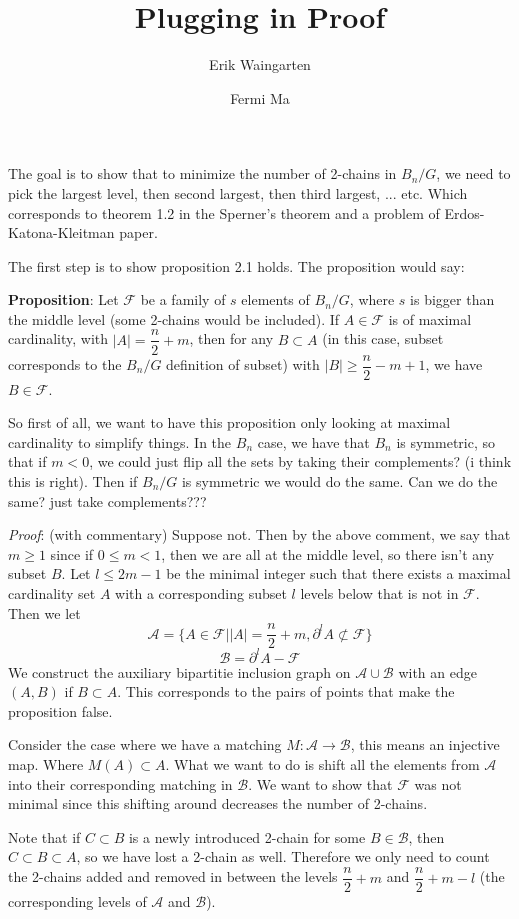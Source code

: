 \documentclass[11pt]{article}
\author{Erik Waingarten \and Fermi Ma}
\title{Plugging in Proof}
\newcommand{\F}{\mathcal{F}}
\newcommand{\A}{\mathcal{A}}
\newcommand{\B}{\mathcal{B}}
\begin{document}
         
\maketitle

The goal is to show that to minimize the number of 2-chains in $B_n/G$, we need to pick the largest level, then second largest, then third largest, ... etc. Which corresponds to theorem 1.2 in the Sperner's theorem and a problem of Erdos-Katona-Kleitman paper.

The first step is to show proposition 2.1 holds. The proposition would say:

\textbf{Proposition}: Let $\F$ be a family of $s$ elements of $B_n/G$, where $s$ is bigger than the middle level (some 2-chains would be included). If $A \in \F$ is of maximal cardinality, with $|A| = \dfrac{n}{2} + m$, then for any $B \subset A$ (in this case, subset corresponds to the $B_n/G$ definition of subset) with $|B| \geq \dfrac{n}{2} - m + 1$, we have $B \in \F$.

So first of all, we want to have this proposition only looking at maximal cardinality to simplify things. In the $B_n$ case, we have that $B_n$ is symmetric, so that if $m < 0$, we could just flip all the sets by taking their complements? (i think this is right). Then if $B_n/G$ is symmetric we would do the same. Can we do the same? just take complements??? 

\textit{Proof}: (with commentary) Suppose not. Then by the above comment, we say that $m\geq 1$ since if $0\leq m<1$, then we are all at the middle level, so there isn't any subset $B$. Let $l \leq 2m - 1$ be the minimal integer such that there exists a maximal cardinality set $A$ with a corresponding subset $l$ levels below that is not in $\F$. Then we let 
\[ \A = \{ A \in \F | |A| = \dfrac{n}{2} + m, \partial^lA \not\subset \F \} \]
\[ \B = \partial^lA - \F \]
We construct the auxiliary bipartitie inclusion graph on $\A \cup \B$ with an edge $(A, B)$ if $B \subset A$. This corresponds to the pairs of points that make the proposition false. 

Consider the case where we have a matching $M: \A \rightarrow \B$, this means an injective map. Where $M(A) \subset A$. What we want to do is shift all the elements from $\A$ into their corresponding matching in $\B$. We want to show that $\F$ was not minimal since this shifting around decreases the number of 2-chains. 

Note that if $C \subset B$ is a newly introduced 2-chain for some $B \in \B$, then $C \subset B \subset A$, so we have lost a 2-chain as well. Therefore we only need to count the 2-chains added and removed in between the levels $\dfrac{n}{2} + m$ and $\dfrac{n}{2} + m - l$ (the corresponding levels of $\A$ and $\B$). 
\end{document}
